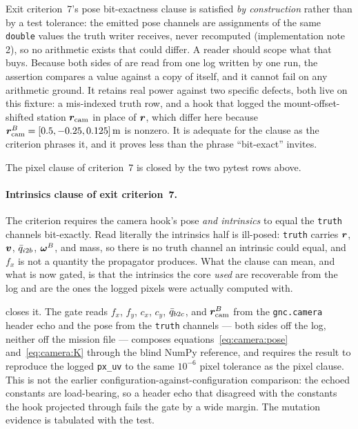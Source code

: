 Exit criterion~7's pose bit-exactness clause is satisfied \emph{by
construction} rather than by a test tolerance: the emitted pose channels
are assignments of the same \texttt{double} values the truth writer
receives, never recomputed (implementation note 2), so no arithmetic
exists that could differ. A reader should scope what that buys. Because
both sides of  are
read from one log written by one run, the assertion compares a value
against a copy of itself, and it cannot fail on any arithmetic ground. It
retains real power against two specific defects, both live on this
fixture: a mis-indexed truth row, and a hook that logged the
mount-offset-shifted station $\bm{r}_{\mathrm{cam}}$ in place of $\bm{r}$,
which differ here because $\vv{r}^{B}_{\mathrm{cam}} = [0.5, -0.25,
0.125]\,\unit{\metre}$ is nonzero. It is adequate for the clause as the
criterion phrases it, and it proves less than the phrase ``bit-exact''
invites.

The pixel clause of criterion~7 is closed by the two pytest rows above.

\paragraph{Intrinsics clause of exit criterion~7.} The criterion requires
the camera hook's pose \emph{and intrinsics} to equal the \texttt{truth}
channels bit-exactly. Read literally the intrinsics half is ill-posed:
\texttt{truth} carries $\bm{r}$, $\bm{v}$, $\bar{q}_{i2b}$,
$\bm{\omega}^{B}$, and mass, so there is no truth channel an intrinsic
could equal, and $f_x$ is not a quantity the propagator produces. What
the clause can mean, and what is now gated, is that the intrinsics the
core \emph{used} are recoverable from the log and are the ones the logged
pixels were actually computed with.

 closes it.
The gate reads $f_x$, $f_y$, $c_x$, $c_y$, $\bar{q}_{b2c}$, and
$\bm{r}^{B}_{\mathrm{cam}}$ from the \texttt{gnc.camera} header echo and
the pose from the \texttt{truth} channels --- both sides off the log,
neither off the mission file --- composes
equations~\eqref{eq:camera:pose} and~\eqref{eq:camera:K} through the blind
NumPy reference, and requires the result to reproduce the logged
\texttt{px\_uv} to the same $10^{-6}$ pixel tolerance as the pixel clause.
This is not the earlier configuration-against-configuration comparison:
the echoed constants are load-bearing, so a header echo that disagreed
with the constants the hook projected through fails the gate by a wide
margin. The mutation evidence is tabulated with the test.

